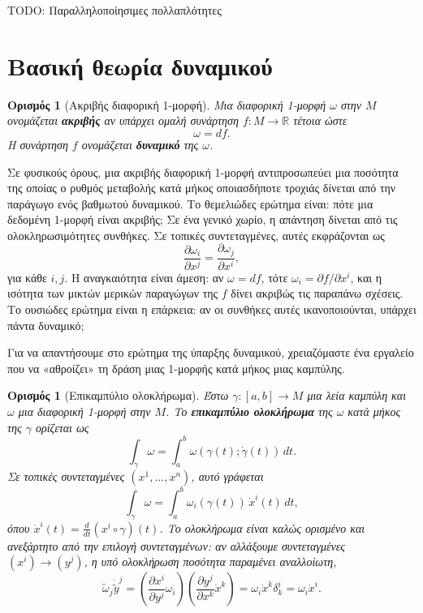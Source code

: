 \documentclass[11pt,a4paper,twoside,openright]{book}
\newtheorem{definition}[lemma]{Ορισμός}
\begin{document}
TODO: Παραλληλοποίησιμες πολλαπλότητες

\section{Βασική θεωρία δυναμικού}\label{sec:basic-potential-theory}

\begin{definition}[Ακριβής διαφορική 1-μορφή]
Μια διαφορική 1-μορφή $\omega$ στην $M$ ονομάζεται \textbf{ακριβής} αν υπάρχει ομαλή συνάρτηση $f: M \to \mathbb{R}$ τέτοια ώστε
\begin{equation}
\omega = df.
\end{equation}
Η συνάρτηση $f$ ονομάζεται \textbf{δυναμικό} της $\omega$.
\end{definition}

Σε φυσικούς όρους, μια ακριβής διαφορική 1-μορφή αντιπροσωπεύει μια ποσότητα της οποίας ο ρυθμός μεταβολής κατά μήκος οποιασδήποτε τροχιάς δίνεται από την παράγωγο ενός βαθμωτού δυναμικού. Το θεμελιώδες ερώτημα είναι: πότε μια δεδομένη 1-μορφή είναι ακριβής; Σε ένα γενικό χωρίο, η απάντηση δίνεται από τις ολοκληρωσιμότητες συνθήκες. Σε τοπικές συντεταγμένες, αυτές εκφράζονται ως
\begin{equation}
\frac{\partial \omega_i}{\partial x^j} = \frac{\partial \omega_j}{\partial x^i},
\end{equation}
για κάθε $i, j$. Η αναγκαιότητα είναι άμεση: αν $\omega = df$, τότε $\omega_i = \partial f / \partial x^i$, και η ισότητα των μικτών μερικών παραγώγων της $f$ δίνει ακριβώς τις παραπάνω σχέσεις. Το ουσιώδες ερώτημα είναι η επάρκεια: αν οι συνθήκες αυτές ικανοποιούνται, υπάρχει πάντα δυναμικό;

Για να απαντήσουμε στο ερώτημα της ύπαρξης δυναμικού, χρειαζόμαστε ένα εργαλείο που να «αθροίζει» τη δράση μιας 1-μορφής κατά μήκος μιας καμπύλης.

\begin{definition}[Επικαμπύλιο ολοκλήρωμα]
Έστω $\gamma: [a, b] \to M$ μια λεία καμπύλη και $\omega$ μια διαφορική 1-μορφή στην $M$. Το \textbf{επικαμπύλιο ολοκλήρωμα} της $\omega$ κατά μήκος της $\gamma$ ορίζεται ως
\begin{equation}
\int_{\gamma} \omega = \int_{a}^{b} \omega(\gamma(t); \dot{\gamma}(t)) \, dt.
\end{equation}
Σε τοπικές συντεταγμένες $(x^1, \dots, x^n)$, αυτό γράφεται
\begin{equation}
\int_{\gamma} \omega = \int_{a}^{b} \omega_i(\gamma(t)) \, \dot{x}^i(t) \, dt,
\end{equation}
όπου $\dot{x}^i(t) = \frac{d}{dt}(x^i \circ \gamma)(t)$. Το ολοκλήρωμα είναι καλώς ορισμένο και ανεξάρτητο από την επιλογή συντεταγμένων: αν αλλάξουμε συντεταγμένες $(x^i) \to (y^j)$, η υπό ολοκλήρωση ποσότητα παραμένει αναλλοίωτη,
\[
\tilde{\omega}_j \dot{\tilde{y}}^j = \left( \frac{\partial x^i}{\partial y^j} \omega_i \right) \left( \frac{\partial y^j}{\partial x^k} \dot{x}^k \right) = \omega_i \dot{x}^k \delta^i_k = \omega_i \dot{x}^i.
\]
\end{definition}
\end{document}
